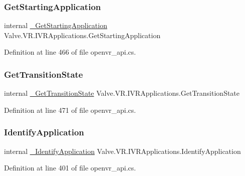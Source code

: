 \subsubsection{\texorpdfstring{GetStartingApplication}{GetStartingApplication}}
{\footnotesize\ttfamily internal \mbox{\hyperlink{struct_valve_1_1_v_r_1_1_i_v_r_applications_a1eb7aeb6422c2a09ecf379532597cb05}{\+\_\+\+Get\+Starting\+Application}} Valve.\+V\+R.\+I\+V\+R\+Applications.\+Get\+Starting\+Application}



Definition at line 466 of file openvr\+\_\+api.\+cs.

\mbox{\label{struct_valve_1_1_v_r_1_1_i_v_r_applications_a05945f77ee67816eac9b62a4eba9a200}} 
\subsubsection{\texorpdfstring{GetTransitionState}{GetTransitionState}}
{\footnotesize\ttfamily internal \mbox{\hyperlink{struct_valve_1_1_v_r_1_1_i_v_r_applications_a047619f84dbe4e1fc9faadd800669ac3}{\+\_\+\+Get\+Transition\+State}} Valve.\+V\+R.\+I\+V\+R\+Applications.\+Get\+Transition\+State}



Definition at line 471 of file openvr\+\_\+api.\+cs.

\mbox{\label{struct_valve_1_1_v_r_1_1_i_v_r_applications_a5f943da628af5c0193325edde764cc6a}} 
\subsubsection{\texorpdfstring{IdentifyApplication}{IdentifyApplication}}
{\footnotesize\ttfamily internal \mbox{\hyperlink{struct_valve_1_1_v_r_1_1_i_v_r_applications_a461680d41f9d889cd818446eb65c113b}{\+\_\+\+Identify\+Application}} Valve.\+V\+R.\+I\+V\+R\+Applications.\+Identify\+Application}



Definition at line 401 of file openvr\+\_\+api.\+cs.

